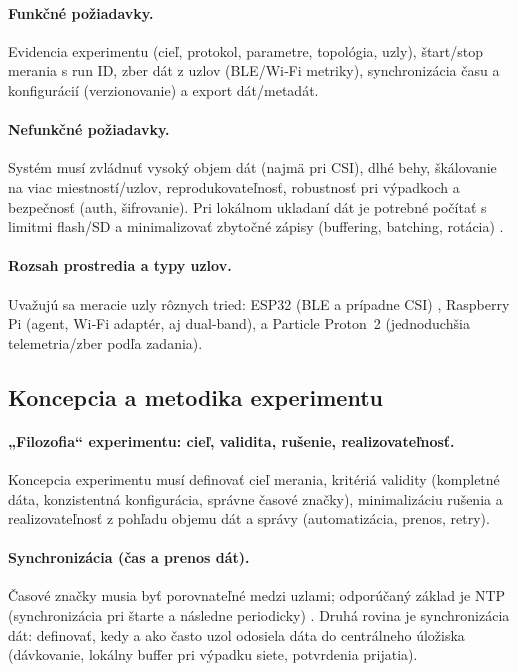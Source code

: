\paragraph{Funkčné požiadavky.}
Evidencia experimentu (cieľ, protokol, parametre, topológia, uzly), štart/stop merania s run ID, zber dát z uzlov (BLE/Wi‑Fi metriky),
synchronizácia času a konfigurácií (verzionovanie) a export dát/metadát.

\paragraph{Nefunkčné požiadavky.}
Systém musí zvládnuť vysoký objem dát (najmä pri CSI), dlhé behy, škálovanie na viac miestností/uzlov, reprodukovateľnosť,
robustnosť pri výpadkoch a bezpečnosť (auth, šifrovanie). Pri lokálnom ukladaní dát je potrebné počítať s limitmi flash/SD
a minimalizovať zbytočné zápisy (buffering, batching, rotácia) \cite{flash_wear_note}.

\paragraph{Rozsah prostredia a typy uzlov.}
Uvažujú sa meracie uzly rôznych tried: ESP32 (BLE a prípadne CSI) \cite{espressif_esp_csi_doc}, Raspberry Pi (agent, Wi‑Fi adaptér, aj dual‑band),
a Particle Proton~2 (jednoduchšia telemetria/zber podľa zadania).

\subsection{Koncepcia a metodika experimentu}
\label{subsec:experiment-concept}

\paragraph{„Filozofia“ experimentu: cieľ, validita, rušenie, realizovateľnosť.}
Koncepcia experimentu musí definovať cieľ merania, kritériá validity (kompletné dáta, konzistentná konfigurácia, správne časové značky),
minimalizáciu rušenia a realizovateľnosť z pohľadu objemu dát a správy (automatizácia, prenos, retry).

\paragraph{Synchronizácia (čas a prenos dát).}
Časové značky musia byť porovnateľné medzi uzlami; odporúčaný základ je NTP (synchronizácia pri štarte a následne periodicky)
\cite{ntp_rfc5905}. Druhá rovina je synchronizácia dát: definovať, kedy a ako často uzol odosiela dáta do centrálneho úložiska
(dávkovanie, lokálny buffer pri výpadku siete, potvrdenia prijatia).

